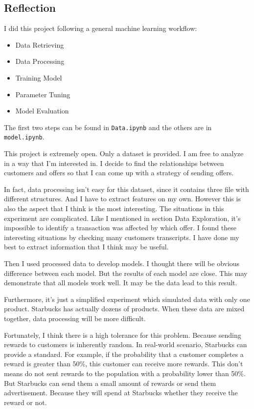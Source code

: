 \documentclass[a4paper,12pt]{article}
\begin{document}
\subsection*{Reflection}

I did this project following a general machine learning workflow: 

\begin{itemize}

    \item Data Retrieving
    \item Data Processing
    \item Training Model
    \item Parameter Tuning
    \item Model Evaluation

\end{itemize}

The first two steps can be found in \texttt{Data.ipynb} and the others are in \texttt{model.ipynb}.

This project is extremely open. Only a dataset is provided. I am free to analyze in a way that I'm interested in. I decide to 
find the relationships between customers and offers so that I can come up with a strategy of sending offers.

In fact, data processing isn't easy for this dataset, since it contains three file with different structures. And I have to 
extract features on my own. However this is also the aspect that I think is the most interesting. The situations in this 
experiment are complicated. Like I mentioned in section Data Exploration, it's impossible to identify a transaction was affected 
by which offer. I found these interesting situations by checking many customers transcripts. I have done my best to extract 
information that I think may be useful. 

Then I used processed data to develop models. I thought there will be obvious difference between each model. But the results of 
each model are close. This may demonstrate that all models work well. It may be the data lead to this result.

Furthermore, it's just a simplified experiment which simulated data with only one product. Starbucks has actually dozens of 
products. When these data are mixed together, data processing will be more difficult.

Fortunately, I think there is a high tolerance for this problem. Because sending rewards to customers is inherently random. In 
real-world scenario, Starbucks can provide a standard. For example, if the probability that a customer completes a reward is 
greater than 50\%, this customer can receive more rewards. This don't means do not sent rewards to the population with a 
probability lower than 50\%. But Starbucks can send them a small amount of rewards or send them advertisement. Because they will 
spend at Starbucks whether they receive the reward or not.
\end{document}
